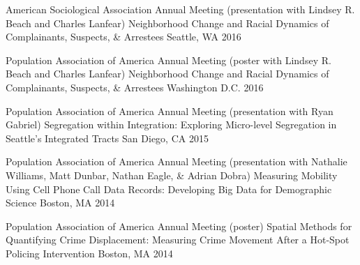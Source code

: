 \begin{cventries}
  \cventry
    {American Sociological Association Annual Meeting (presentation with Lindsey R. Beach and Charles Lanfear)} %
    {Neighborhood Change and Racial Dynamics of Complainants, Suspects, \& Arrestees} %
    {Seattle, WA} %
    {2016} %
    {}


  \cventry
    {Population Association of America Annual Meeting (poster with Lindsey R. Beach and Charles Lanfear)} %
    {Neighborhood Change and Racial Dynamics of Complainants, Suspects, \& Arrestees} %
    {Washington D.C.} %
    {2016} %
    {}

  \cventry
    {Population Association of America Annual Meeting (presentation with Ryan Gabriel)} %
    {Segregation within Integration: Exploring Micro-level Segregation in Seattle's Integrated Tracts} %
    {San Diego, CA} %
    {2015} %
    {}

  \cventry
    {Population Association of America Annual Meeting (presentation with Nathalie Williams, Matt Dunbar, Nathan Eagle, \& Adrian Dobra)} %
    {Measuring Mobility Using Cell Phone Call Data Records: Developing Big Data for Demographic Science} %
    {Boston, MA} %
    {2014} %
    {}

  \cventry
    {Population Association of America Annual Meeting (poster)} %
    {Spatial Methods for Quantifying Crime Displacement: Measuring Crime Movement After a Hot-Spot Policing Intervention} %
    {Boston, MA} %
    {2014} %
    {}




\end{cventries}
